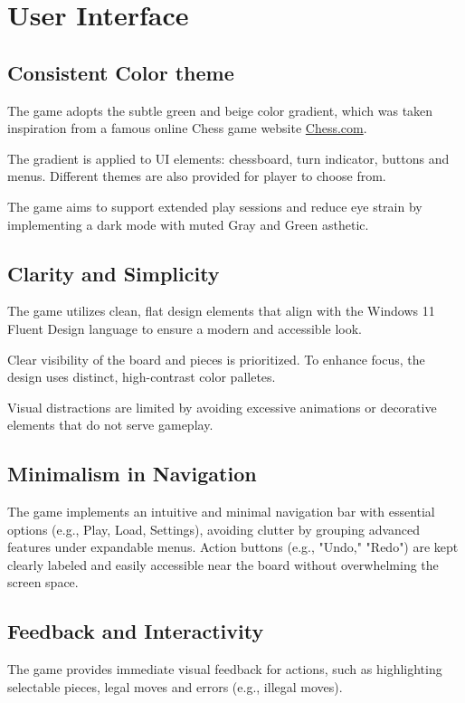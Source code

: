 \documentclass[a4paper, 10pt, titlepage]{report}
\begin{document}
\section{User Interface}
\subsection{Consistent Color theme}
The game adopts the subtle green and beige color gradient, which was taken inspiration from a famous online Chess game website \href{https://chess.com/}{Chess.com}.

The gradient is applied to UI elements: chessboard, turn indicator, buttons and menus. Different themes are also provided for player to choose from.

The game aims to support extended play sessions and reduce eye strain by implementing a dark mode with muted Gray and Green asthetic.
\subsection{Clarity and Simplicity}
The game utilizes clean, flat design elements that align with the Windows 11 Fluent Design language to ensure a modern and accessible look.

Clear visibility of the board and pieces is prioritized. To enhance focus, the design uses distinct, high-contrast color palletes.

Visual distractions are limited by avoiding excessive animations or decorative elements that do not serve gameplay.
\subsection{Minimalism in Navigation}
The game implements an intuitive and minimal navigation bar with essential options (e.g., Play, Load, Settings), avoiding clutter by grouping advanced features under expandable menus. Action buttons (e.g., "Undo," "Redo") are kept clearly labeled and easily accessible near the board without overwhelming the screen space.
\subsection{Feedback and Interactivity}
The game provides immediate visual feedback for actions, such as highlighting selectable pieces, legal moves and errors (e.g., illegal moves).
\end{document}
